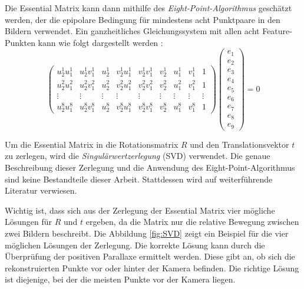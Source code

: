 Die Essential Matrix kann dann mithilfe des \emph{Eight-Point-Algorithmus} geschätzt werden, der die epipolare Bedingung für mindestens acht Punktpaare in den Bildern verwendet. Ein ganzheitliches Gleichungssystem mit allen acht Feature-Punkten kann wie folgt dargestellt werden \cite{gao2021vSLAM, stachniss2020FandEmatrix, hartley1997eightpoint}:
\begin{equation}
    \begin{pmatrix}
        u_2^1 u_1^1 & u_2^1 v_1^1 & u_2^1 & v_2^1 u_1^1 & v_2^1 v_1^1 & v_2^1 & u_1^1 & v_1^1 & 1 \\
        u_2^2 u_1^2 & u_2^2 v_1^2 & u_2^2 & v_2^2 u_1^2 & v_2^2 v_1^2 & v_2^2 & u_1^2 & v_1^2 & 1 \\
        \vdots & \vdots & \vdots & \vdots & \vdots & \vdots & \vdots & \vdots & \vdots \\
        u_2^8 u_1^8 & u_2^8 v_1^8 & u_2^8 & v_2^8 u_1^8 & v_2^8 v_1^8 & v_2^8 & u_1^8 & v_1^8 & 1 
    \end{pmatrix}
    \begin{pmatrix}
        e_1 \\ e_2 \\ e_3 \\ e_4 \\ e_5 \\ e_6 \\ e_7 \\ e_8 \\ e_9
    \end{pmatrix}
    = 0
\end{equation}

Um die Essential Matrix in die Rotationsmatrix \( R \) und den Translationsvektor \( t \) zu zerlegen, wird die \emph{Singulärwertzerlegung} (SVD) verwendet. Die genaue Beschreibung dieser Zerlegung und die Anwendung des Eight-Point-Algorithmus sind keine Bestandteile dieser Arbeit. Stattdessen wird auf weiterführende Literatur verwiesen. \cite{gao2021vSLAM, tsai1984svd, hartley1997eightpoint}

Wichtig ist, dass sich aus der Zerlegung der Essential Matrix vier mögliche Lösungen für \( R \) und \( t \) ergeben, da die Matrix nur die relative Bewegung zwischen zwei Bildern beschreibt. Die Abbildung \ref{fig:SVD} zeigt ein Beispiel für die vier möglichen Lösungen der Zerlegung. Die korrekte Lösung kann durch die Überprüfung der positiven Parallaxe ermittelt werden. Diese gibt an, ob sich die rekonstruierten Punkte vor oder hinter der Kamera befinden. Die richtige Lösung ist diejenige, bei der die meisten Punkte vor der Kamera liegen. \cite{gao2021vSLAM}

